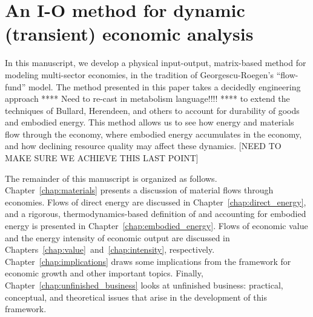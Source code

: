 %

\section{An I-O method for dynamic (transient) economic analysis}

In this manuscript, we develop a physical input-output, 
matrix-based method for modeling multi-sector economies, 
in the tradition of Georgescu-Roegen's ``flow-fund'' 
model.\cite{G-R1979a, G-R1979b} 
The method presented in this paper takes a decidedly engineering approach
**** Need to re-cast in metabolism language!!!! **** 
to extend the techniques of Bullard, Herendeen, and others 
to account for durability of goods and embodied energy. 
This method allows us to see how energy and materials flow through the economy, 
where embodied energy accumulates in the economy, 
and how declining resource quality may affect these dynamics. 
[NEED TO MAKE SURE WE ACHIEVE THIS LAST POINT]

The remainder of this manuscript is organized as follows. 
Chapter~\ref{chap:materials} presents a discussion of material flows through economies.
Flows of direct energy are discussed in Chapter~\ref{chap:direct_energy}, 
and a rigorous, thermodynamics-based definition of and accounting for 
embodied energy is presented in Chapter~\ref{chap:embodied_energy}. 
Flows of economic value and the energy intensity of economic output are
discussed in Chapters~\ref{chap:value}~and~\ref{chap:intensity}, respectively.
Chapter~\ref{chap:implications} draws some implications 
from the framework for economic growth and other important topics.
Finally, Chapter~\ref{chap:unfinished_business} looks at 
unfinished business: practical, conceptual, and theoretical issues
that arise in the development of this framework.

